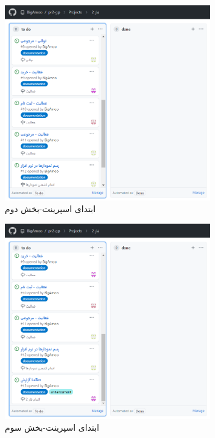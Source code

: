 \documentclass[12pt,a4paper]{article}
\begin{document}
		\begin{figure}[h!]
			\begin{center}
				\includegraphics[width=9cm]{images/screenshot_2.png}
			\end{center}
			\caption{ابتدای اسپرینت-بخش دوم}
		\end{figure}
			\begin{figure}[h!]
			\begin{center}
				\includegraphics[width=9cm]{images/screenshot_3.png}	
			\end{center}
			\caption{ابتدای اسپرینت-بخش سوم}
		\end{figure}
		
\end{document}

